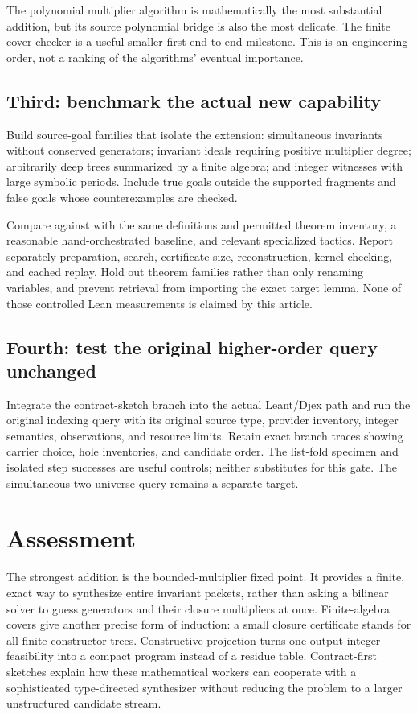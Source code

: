The polynomial multiplier algorithm is mathematically the most substantial
addition, but its source polynomial bridge is also the most delicate. The finite
cover checker is a useful smaller first end-to-end milestone. This is an
engineering order, not a ranking of the algorithms' eventual importance.

\subsection{Third: benchmark the actual new capability}
Build source-goal families that isolate the extension: simultaneous invariants
without conserved generators; invariant ideals requiring positive multiplier
degree; arbitrarily deep trees summarized by a finite algebra; and integer
witnesses with large symbolic periods. Include true goals outside the supported
fragments and false goals whose counterexamples are checked.

Compare against  with the same definitions and permitted theorem
inventory, a reasonable hand-orchestrated baseline, and relevant specialized
tactics. Report separately preparation, search, certificate size, reconstruction,
kernel checking, and cached replay. Hold out theorem families rather than only
renaming variables, and prevent retrieval from importing the exact target
lemma. None of those controlled Lean measurements is claimed by this article.

\subsection{Fourth: test the original higher-order query unchanged}
Integrate the contract-sketch branch into the actual Leant/Djex path and run the
original indexing query with its original source type, provider inventory,
integer semantics, observations, and resource limits. Retain exact branch traces
showing carrier choice, hole inventories, and candidate order. The list-fold
specimen and isolated step successes are useful controls; neither substitutes
for this gate. The simultaneous two-universe query remains a separate target.

\section{Assessment}
The strongest addition is the bounded-multiplier fixed point. It provides a
finite, exact way to synthesize entire invariant packets, rather than asking a
bilinear solver to guess generators and their closure multipliers at once.
Finite-algebra covers give another precise form of induction: a small closure
certificate stands for all finite constructor trees. Constructive projection
turns one-output integer feasibility into a compact program instead of a residue
table. Contract-first sketches explain how these mathematical workers can
cooperate with a sophisticated type-directed synthesizer without reducing the
problem to a larger unstructured candidate stream.

